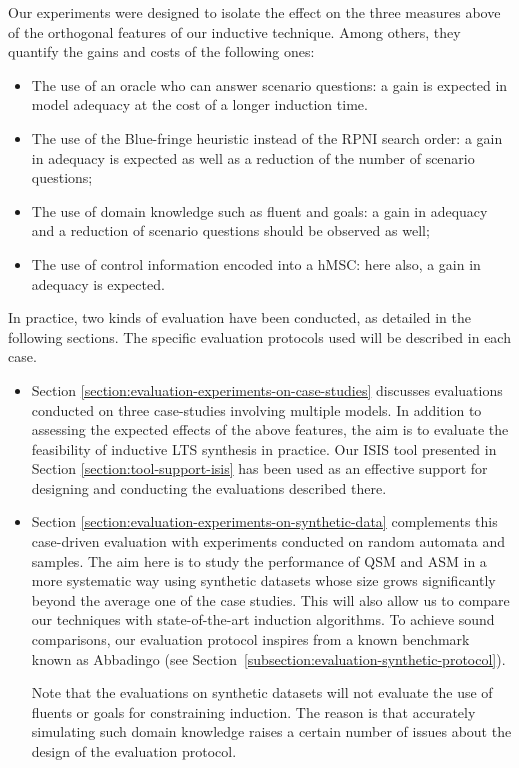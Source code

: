 Our experiments were designed to isolate the effect on the three measures above of the orthogonal features of our inductive technique. Among others, they quantify the gains and costs of the following ones:
\begin{itemize}
\item The use of an oracle who can answer scenario questions: a gain is expected in model adequacy at the cost of a longer induction time.
\item The use of the Blue-fringe heuristic instead of the RPNI search order: a gain in adequacy is expected as well as a reduction of the number of scenario questions;
\item The use of domain knowledge such as fluent and goals: a gain in adequacy and a reduction of scenario questions should be observed as well;
\item The use of control information encoded into a hMSC: here also, a gain in adequacy is expected.
\end{itemize}

In practice, two kinds of evaluation have been conducted, as detailed in the following sections. The specific evaluation protocols used will be described in each case.
\begin{itemize}

\item Section \ref{section:evaluation-experiments-on-case-studies} discusses evaluations conducted on three case-studies involving multiple models. In addition to assessing the expected effects of the above features, the aim is to evaluate the feasibility of inductive LTS synthesis in practice. Our ISIS tool presented in Section \ref{section:tool-support-isis} has been used as an effective support for designing and conducting the evaluations described there.

\item Section \ref{section:evaluation-experiments-on-synthetic-data} complements this case-driven evaluation with experiments conducted on random automata and samples. The aim here is to study the performance of QSM and ASM in a more systematic way using synthetic datasets whose size grows significantly beyond the average one of the case studies. This will also allow us to compare our techniques with state-of-the-art induction algorithms. To achieve sound comparisons, our evaluation protocol inspires from a known benchmark known as Abbadingo \cite{Lang:1998} (see Section~\ref{subsection:evaluation-synthetic-protocol}).

Note that the evaluations on synthetic datasets will not evaluate the use of fluents or goals for constraining induction. The reason is that accurately simulating such domain knowledge raises a certain number of issues about the design of the evaluation protocol.

\end{itemize}
